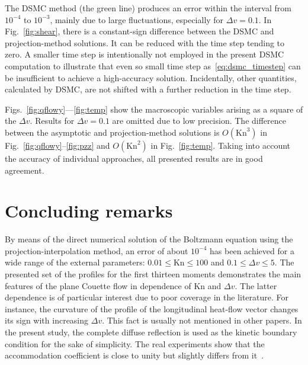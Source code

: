 \documentclass[]{elsarticle} %
\newcommand{\Kn}{\mathrm{Kn}}
\newcommand{\OO}[1]{O(#1)}
\begin{document}
The DSMC method (the green line) produces an error within the interval from \(10^{-4}\) to \(10^{-3}\),
mainly due to large fluctuations, especially for \(\Delta{v}=0.1\).
In Fig.~\ref{fig:shear}, there is a constant-sign difference
between the DSMC and projection-method solutions.
It can be reduced with the time step tending to zero.
A smaller time step is intentionally not employed in the present DSMC computation
to illustrate that even so small time step as~\eqref{eq:dsmc_timestep} can be insufficient
to achieve a high-accuracy solution.
Incidentally, other quantities, calculated by DSMC, are not shifted with
a further reduction in the time step.

Figs.~\ref{fig:qflowy}---\ref{fig:temp} show the macroscopic variables
arising as a square of the \(\Delta{v}\).
Results for \(\Delta{v}=0.1\) are omitted due to low precision.
The difference between the asymptotic and projection-method solutions
is \(\OO{\Kn^3}\) in Fig.~\ref{fig:qflowy}--\ref{fig:pzz} and \(\OO{\Kn^2}\) in Fig.~\ref{fig:temp}.
Taking into account the accuracy of individual approaches,
all presented results are in good agreement.

\section{Concluding remarks}

By means of the direct numerical solution of the Boltzmann equation using the projection-interpolation method,
an error of about \(10^{-4}\) has been achieved for a wide range of the external parameters:
\(0.01 \le \Kn \le 100\) and \(0.1 \le \Delta{v} \le 5\).
The presented set of the profiles for the first thirteen moments demonstrates
the main features of the plane Couette flow in dependence of \(\Kn\) and \(\Delta{v}\).
The latter dependence is of particular interest due to poor coverage in the literature.
For instance, the curvature of the profile of the longitudinal heat-flow vector
changes its sign with increasing \(\Delta{v}\).
This fact is usually not mentioned in other papers.
In the present study, the complete diffuse reflection is used as the kinetic boundary condition
for the sake of simplicity. The real experiments show that the accommodation coefficient
is close to unity but slightly differs from it~\citep{Agrawal2008}.
\end{document}
